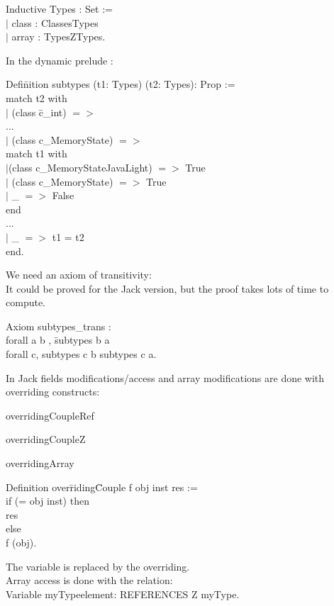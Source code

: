 {\purple Inductive} Types : Set :=\\
$|$    class : Classes\rarrow Types\\
$|$ array : Types\rarrow Z\rarrow Types.



\small
\blist
\item In the dynamic prelude :
\begin{tabbing}
{\purple Defi}\={\purple nition} subtypes (t1: Types) (t2: Types): Prop :=\+\\
   {\purple match} t2 {\purple with}\\
    $|$ (class \=c\_int) $=>$\+ \\
       ...\-\\
    $|$ (class c\_MemoryState) $=>$\+\\ {\purple match} t1 {\purple with}\\
        $|$(class c\_MemoryStateJavaLight) $=>$ True\\
        $|$ (class c\_MemoryState) $=>$ True\\
        $|$ \_ $=>$ False\\
        {\purple end}\\
       ... \-\\
    $|$ \_ $=>$ t1 = t2\\
    {\purple end}.
\end{tabbing}
\elist
{} 
We need an  {\purple axiom of transitivity}:\\
\rarrow It could be proved for the Jack version, but the proof 
takes lots of time to compute.
\begin{tabbing}
 {\purple Axiom} subtypes\_trans :\\
 {\purple forall} a b , \= subtypes b a  \rarrow \+ \\
  {\purple forall} c, subtypes c b \rarrow subtypes  c a. 
\end{tabbing}
\small
In Jack fields modifications/access and array modifications are done with 
 {\purple overriding constructs}:
\blist
\item overridingCoupleRef
\item overridingCoupleZ
\item overridingArray
\elist
\begin{tabbing}
 {\purple Definition} over\=riding\=Couple f obj inst res  := \+ \\
 if (= obj inst) then  \+ \\
      res \- \\
 else\+ \\
    f (obj).
\end{tabbing}
The variable is replaced by the overriding.\\
Array access is done with the relation: \\
 {\purple Variable} myTypeelement: REFERENCES \rarrow Z \rarrow myType. 

